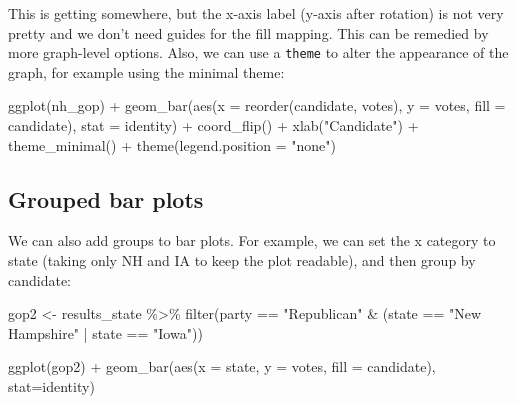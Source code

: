 \documentclass[
]{article}
\newenvironment{Shaded}{\begin{snugshade}}{\end{snugshade}}
\newcommand{\AttributeTok}[1]{\textcolor[rgb]{0.77,0.63,0.00}{#1}}
\newcommand{\FunctionTok}[1]{\textcolor[rgb]{0.00,0.00,0.00}{#1}}
\newcommand{\NormalTok}[1]{#1}
\newcommand{\OtherTok}[1]{\textcolor[rgb]{0.56,0.35,0.01}{#1}}
\newcommand{\SpecialCharTok}[1]{\textcolor[rgb]{0.00,0.00,0.00}{#1}}
\newcommand{\StringTok}[1]{\textcolor[rgb]{0.31,0.60,0.02}{#1}}
\begin{document}
This is getting somewhere, but the x-axis label (y-axis after rotation)
is not very pretty and we don't need guides for the fill mapping. This
can be remedied by more graph-level options. Also, we can use a
\texttt{theme} to alter the appearance of the graph, for example using
the minimal theme:

\begin{Shaded}
\begin{Highlighting}[]
\FunctionTok{ggplot}\NormalTok{(nh\_gop) }\SpecialCharTok{+} 
  \FunctionTok{geom\_bar}\NormalTok{(}\FunctionTok{aes}\NormalTok{(}\AttributeTok{x =} \FunctionTok{reorder}\NormalTok{(candidate, votes), }\AttributeTok{y =}\NormalTok{ votes, }\AttributeTok{fill =}\NormalTok{ candidate), }
           \AttributeTok{stat =} \StringTok{\textquotesingle{}identity\textquotesingle{}}\NormalTok{) }\SpecialCharTok{+} 
  \FunctionTok{coord\_flip}\NormalTok{() }\SpecialCharTok{+}
  \FunctionTok{xlab}\NormalTok{(}\StringTok{"Candidate"}\NormalTok{) }\SpecialCharTok{+} 
  \FunctionTok{theme\_minimal}\NormalTok{() }\SpecialCharTok{+}
  \FunctionTok{theme}\NormalTok{(}\AttributeTok{legend.position =} \StringTok{"none"}\NormalTok{)}
\end{Highlighting}
\end{Shaded}

\hypertarget{grouped-bar-plots}{%
\subsection{Grouped bar plots}\label{grouped-bar-plots}}

We can also add groups to bar plots. For example, we can set the x
category to state (taking only NH and IA to keep the plot readable), and
then group by candidate:

\begin{Shaded}
\begin{Highlighting}[]
\NormalTok{gop2 }\OtherTok{\textless{}{-}}\NormalTok{ results\_state }\SpecialCharTok{\%\textgreater{}\%} 
  \FunctionTok{filter}\NormalTok{(party }\SpecialCharTok{==} \StringTok{"Republican"} \SpecialCharTok{\&}\NormalTok{ (state }\SpecialCharTok{==} \StringTok{"New Hampshire"} \SpecialCharTok{|}\NormalTok{ state }\SpecialCharTok{==} \StringTok{"Iowa"}\NormalTok{)) }

\FunctionTok{ggplot}\NormalTok{(gop2) }\SpecialCharTok{+} 
  \FunctionTok{geom\_bar}\NormalTok{(}\FunctionTok{aes}\NormalTok{(}\AttributeTok{x =}\NormalTok{ state, }\AttributeTok{y =}\NormalTok{ votes, }\AttributeTok{fill =}\NormalTok{ candidate), }
           \AttributeTok{stat=}\StringTok{\textquotesingle{}identity\textquotesingle{}}\NormalTok{)}
\end{Highlighting}
\end{Shaded}
\end{document}
